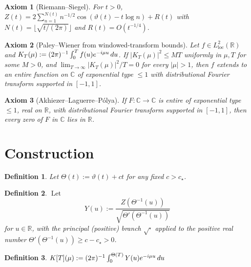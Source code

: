 \documentclass{article}
\newcommand{\assign}{:=}
\newcommand{\tmop}[1]{\ensuremath{\operatorname{#1}}}
\newtheorem{axiom}{Axiom}
\newtheorem{definition}{Definition}
\newcommand{\R}{\mathbb{R}}
\newcommand{\C}{\mathbb{C}}
\begin{document}
\begin{axiom}
  [Riemann--Siegel]\label{ax:RS} For $t > 0$, $Z (t) = 2 \sum_{n = 1}^{N (t)}
  n^{- 1 / 2} \cos (\vartheta (t) - t \log n) + R (t)$ with $N (t) = \lfloor
  \sqrt{t / (2 \pi)} \rfloor$ and $R (t) = O (t^{- 1 / 4})$.
\end{axiom}

\begin{axiom}
  [Paley--Wiener from windowed-transform bounds]\label{ax:PW} Let $f \in
  L^2_{\mathrm{loc}} (\R)$ and $K_T (\mu) \assign (2 \pi)^{- 1}  \int_0^T f
  (u) e^{- i \mu u}  \hspace{0.17em} du$. If $|K_T (\mu) |^2 \le MT$ uniformly
  in $\mu, T$ for some $M > 0$, and $\lim_{T \to \infty} |K_T (\mu) |^2 / T =
  0$ for every $| \mu | > 1$, then $f$ extends to an entire function on $\C$
  of exponential type $\le 1$ with distributional Fourier transform supported
  in $[- 1, 1]$.
\end{axiom}

\begin{axiom}
  [Akhiezer--Laguerre--P{\'o}lya]\label{ax:AK} If $F : \C \to \C$ is entire of
  exponential type $\le 1$, real on $\R$, with distributional Fourier
  transform supported in $[- 1, 1]$, then every zero of $F$ in $\C$ lies in
  $\R$.
\end{axiom}

\section{Construction}

\begin{definition}
  \label{def:Theta}Let $\Theta (t) \assign \vartheta (t) + ct$ for any fixed
  $c > c_{\star}$.
\end{definition}

\begin{definition}
  \label{def:Y}$\tmop{Let}$
  \begin{equation}
    Y (u) \assign \frac{Z (\Theta^{- 1} (u))}{\sqrt{\Theta' (\Theta^{- 1}
    (u))}}
  \end{equation}
  for $u \in \R$, with the principal (positive) branch $\sqrt{\cdot}$ applied
  to the positive real number $\Theta' (\Theta^{- 1} (u)) \ge c - c_{\star} >
  0$.
\end{definition}

\begin{definition}
  \label{def:K}$K [T] (\mu) \assign (2 \pi)^{- 1}  \int_0^{\Theta (T)} Y (u)
  e^{- i \mu u}  \hspace{0.17em} du$
\end{definition}
\end{document}
